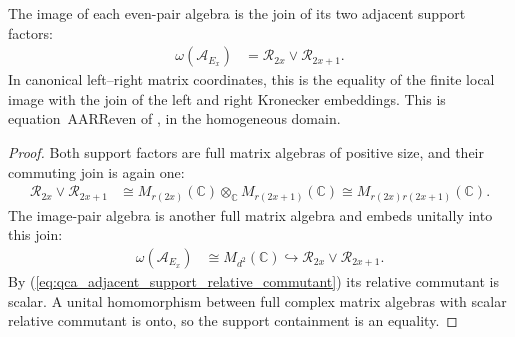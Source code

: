 \begin{lemma}
    \label{lem:qca_image_pair_adjacent_generation}
    \leanok
    The image of each even-pair algebra is the join of its two adjacent
    support factors:
    \begin{align}
        \omega(\mathcal A_{E_x})
         & =\mathcal R_{2x}\vee\mathcal R_{2x+1}.
        \label{eq:qca_image_pair_adjacent_generation}
    \end{align}
    In canonical left--right matrix coordinates, this is the equality
    of the finite local image with the join of the left and right
    Kronecker embeddings. This is equation~AARReven of
    \cite[lines~1276--1287]{Gross2012IndexTheory}, in the homogeneous domain.
\end{lemma}
\begin{proof}\leanok
    Both support factors are full matrix algebras of positive size, and
    their commuting join is again one:
    \begin{align}
        \mathcal R_{2x}\vee\mathcal R_{2x+1}
         & \cong M_{r(2x)}(\mathbb C)\otimes_{\mathbb C}M_{r(2x+1)}(\mathbb C)
        \cong M_{r(2x)r(2x+1)}(\mathbb C).
        \label{eq:qca_image_pair_adjacent_join_matrix}
    \end{align}
    The image-pair algebra is another full matrix algebra and embeds
    unitally into this join:
    \begin{align}
        \omega(\mathcal A_{E_x})
         & \cong M_{d^2}(\mathbb C)
        \hookrightarrow\mathcal R_{2x}\vee\mathcal R_{2x+1}.
        \label{eq:qca_image_pair_unital_embedding}
    \end{align}
    By (\ref{eq:qca_adjacent_support_relative_commutant}) its relative
    commutant is scalar. A unital homomorphism between full complex matrix
    algebras with scalar relative commutant is onto, so the support
    containment is an equality.
\end{proof}

